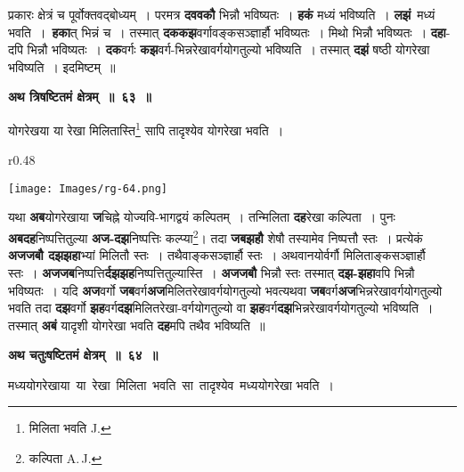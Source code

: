 \documentclass[11pt, openany]{book}
\begin{document}
प्रकारः क्षेत्रं च पूर्वोक्तवद्बोध्यम्~। परमत्र \textbf{दववकौ} भिन्नौ भविष्यतः~। \textbf{हकं} मध्यं भविष्यति~। \textbf{लझं} \,मध्यं \,भवति~। \,\textbf{हका}त् भिन्नं च~। तस्मात् \textbf{दककझ}वर्गावङ्कसञ्ज्ञार्हौ भविष्यतः~। मिथो भिन्नौ भविष्यतः~। \textbf{दहा}-दपि भिन्नौ भविष्यतः~। \textbf{दक}वर्गः \textbf{कझ}वर्ग-भिन्नरेखावर्गयोगतुल्यो भविष्यति~। तस्मात् \textbf{दझं} षष्ठी योगरेखा भविष्यति~। इदमिष्टम्~॥ 
\vspace{2mm}

\begin{center}
\textbf{\large अथ त्रिषष्टितमं क्षेत्रम्~॥~६३~॥ }
\end{center}

{\ab योगरेखया या रेखा मिलितास्ति\renewcommand{\thefootnote}{१}\footnote{मिलिता भवति {\en J.}} सापि तादृश्येव योगरेखा भवति~। }\\

\begin{wrapfigure}{r}{0.48\textwidth}
\vspace{-6mm}
\begin{flushright}
\texttt{[image: Images/rg-64.png]}
\end{flushright}
\vspace{-8mm}
\end{wrapfigure}

 यथा \textbf{अब}योगरेखाया \textbf{ज}चिह्ने योज्यवि-भागद्वयं कल्पितम्~। तन्मिलिता \textbf{दह}रेखा कल्पिता~। पुनः \textbf{अबदह}निष्पत्तितुल्या \textbf{अज-दझ}निष्पत्तिः कल्प्या\renewcommand{\thefootnote}{२}\footnote{कल्पिता  {\en A.\,J.}}\;। तदा \textbf{जबझहौ} शेषौ तस्यामेव निष्पत्तौ स्तः~।  प्रत्येकं \textbf{अजजबौ दझझहा}भ्यां मिलितौ स्तः~। तथैवाङ्कसञ्ज्ञार्हौ स्तः~। अथवानयोर्वर्गौ मिलिताङ्कसञ्ज्ञार्हौ स्तः~। \textbf{अजजब}निष्पत्ति\textbf{र्दझझह}निष्पत्तितुल्यास्ति~। \textbf{अजजबौ} भिन्नौ स्तः तस्मात् \textbf{दझ-झहा}वपि भिन्नौ भविष्यतः~। यदि \textbf{अज}वर्गो \textbf{जब}वर्ग\textbf{अज}मिलितरेखावर्गयोगतुल्यो भवत्यथवा \textbf{जब}वर्ग\textbf{अज}भिन्नरेखावर्गयोगतुल्यो भवति तदा \textbf{दझ}वर्गो \textbf{झह}वर्ग\textbf{दझ}मिलितरेखा-वर्गयोगतुल्यो वा \textbf{झह}वर्ग\textbf{दझ}भिन्नरेखावर्गयोगतुल्यो भविष्यति~। तस्मात् \textbf{अबं} यादृशी योगरेखा भवति \textbf{दह}मपि तथैव भविष्यति~॥

\newpage
\begin{center}
\textbf{\large अथ चतुःषष्टितमं क्षेत्रम्~॥~६४~॥ }
\end{center}

{\ab मध्ययोगरेखाया \,या \,रेखा \,मिलिता \,भवति \,सा \,तादृश्येव \,मध्ययोगरेखा भवति~। }\\
\end{document}
